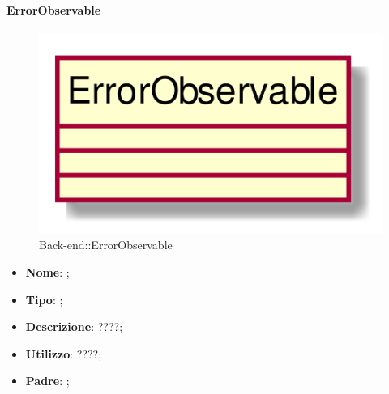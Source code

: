 \hypertarget{ErrorObservable_label}{\paragraph{ErrorObservable}}
\begin{figure}[h]
	\centering
	\includegraphics[width=\textwidth,height=\textheight,keepaspectratio]{images/ClassErrorObservable.png}
	\caption{Back-end::ErrorObservable}
\end{figure}
\begin{itemize}
	\item \textbf{Nome}: ;
	\item \textbf{Tipo}: ;
	\item \textbf{Descrizione}: ????;
	\item \textbf{Utilizzo}: ????;
	\item \textbf{Padre}: ;
\end{itemize}
\FloatBarrier

